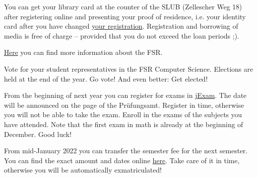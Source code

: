 \begin{itemize}
You can get your library card at the counter of the SLUB (Zellescher Weg 18) after registering online and presenting your proof of residence, i.e. your identity card after you have changed 
\href{https://www.slub-dresden.de/besuchen/nutzerin-der-slub-werden}{your registration}.
Registration and borrowing of media is free of charge -- provided that you do not exceed the loan periods ;).

\hyperlink{sec:fachschaftsrat}{Here}
 you can find more information about the FSR.

Vote for your student representatives in the FSR Computer Science. Elections are held at the end of the year. 
Go vote! And even better: Get elected!


From the beginning of next year you can register for exams in \href{https://jexam.inf.tu-dresden.de/}{jExam}.
The date will be announced on the page of the Prüfungsamt.
Register in time, otherwise you will not be able to take the exam.
Enroll in the exams of the subjects you have attended. Note that the first exam in math is already at the beginning of December. Good luck!

From mid-January 2022 you can transfer the semester fee for the next semester.
You can find the exact amount and dates online \href{https://tu-dresden.de/imma/rueckmeldung}{here}.
Take care of it in time, otherwise you will be automatically exmatriculated!

\end{itemize}


